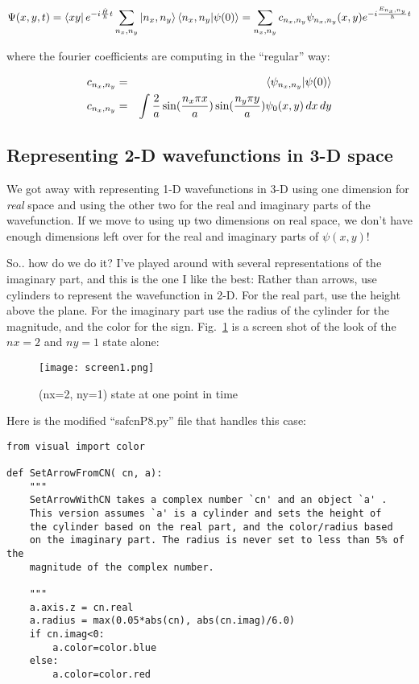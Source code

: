 \documentclass[11pt]{article} %
\begin{document}
\begin{equation}
\Psi(x, y, t) = \bra{xy} e^{-i\frac{\hat{H}}{\hbar} t} \sum_{n_x,n_y} \ket{n_x,n_y}\braket{n_x,n_y|\psi(0)} = \sum_{n_x,n_y} c_{n_x,n_y} \psi_{n_x,n_y}(x,y) e^{-i\frac{E_{n_x,n_y}}{\hbar} t}
\end{equation}

where the fourier coefficients are computing in the ``regular'' way:

\begin{eqnarray}
c_{n_x,n_y} & = & \braket{\psi_{n_x,n_y}|\psi(0)}\\
c_{n_x,n_y} & = & \int \frac{2}{a}\sin(\frac{n_x\pi x}{a})\sin(\frac{n_y\pi y}{a}) \psi_0(x,y)\,dx\,dy
\end{eqnarray}


\subsection*{Representing 2-D wavefunctions in 3-D space}

We got away with representing 1-D wavefunctions in 3-D using one dimension for {\it real} space and using the other two for the real and imaginary parts of the wavefunction. If we move to using up two dimensions on real space, we don't have enough dimensions left over for the real and imaginary parts of $\psi(x,y)$!

So.. how do we do it? I've played around with several representations of the imaginary part, and this is the one I like the best: Rather than arrows, use cylinders to represent the wavefunction in 2-D. For the real part, use the height above the plane. For the imaginary part use the radius of the cylinder for the magnitude, and the color for the sign. Fig.~\ref{fig:(2,1)state} is a screen shot of the look of the $nx=2$ and $ny=1$ state alone:

\begin{figure}[htbp] %
   \centering
   \texttt{[image: screen1.png]} 
   \caption{(nx=2, ny=1) state at one point in time}
   \label{fig:(2,1)state}
\end{figure}

Here is the modified ``safcnP8.py'' file that handles this case:

\begin{verbatim}
from visual import color

def SetArrowFromCN( cn, a):
    """
    SetArrowWithCN takes a complex number `cn' and an object `a' .
    This version assumes `a' is a cylinder and sets the height of
    the cylinder based on the real part, and the color/radius based
    on the imaginary part. The radius is never set to less than 5% of the 
    magnitude of the complex number.

    """
    a.axis.z = cn.real
    a.radius = max(0.05*abs(cn), abs(cn.imag)/6.0)
    if cn.imag<0:
        a.color=color.blue
    else:
        a.color=color.red
        
\end{verbatim}
\end{document}
